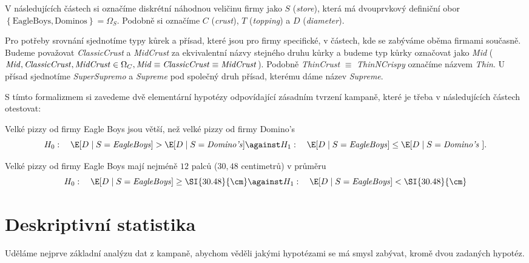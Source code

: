 V následujících částech si označíme diskrétní náhodnou veličinu firmy jako $S$ (\emph{store}), která má dvouprvkový definiční obor $\left\{ \text{EagleBoys}, \text{Dominos} \right\} = \Omega_{S} $. Podobně si označíme $C$ (\emph{crust}),  $T$ (\emph{topping}) a $D$ (\emph{diameter}).

Pro potřeby srovnání sjednotíme typy kůrek a přísad, které jsou pro firmy specifické, v částech, kde se zabýváme oběma firmami současně. Budeme považovat \emph{ClassicCrust} a \emph{MidCrust} za ekvivalentní názvy stejného druhu kůrky a budeme typ kůrky označovat jako \emph{Mid} ($\text{\emph{Mid}} ,\text{\emph{ClassicCrust}} ,\text{\emph{MidCrust}} \in \Omega_{C}, \text{\emph{Mid}} \equiv \text{\emph{ClassicCrust}} \equiv \text{\emph{MidCrust}}$). Podobně \emph{ThinCrust} $\equiv$ \emph{ThinNCrispy} označíme názvem \emph{Thin}. U přísad sjednotíme \emph{SuperSupremo} a \emph{Supreme} pod společný druh přísad, kterému dáme název \emph{Supreme}.

S tímto formalizmem si zavedeme dvě elementární hypotézy odpovídající zásadním tvrzení kampaně, které je třeba v následujících částech otestovat:
\begin{hypothesis}
	\label{hyp:nerovnost_mezi_velikostmi_pizz_firem}
	Velké pizzy od firmy Eagle Boys jsou větší, než velké pizzy od firmy Domino's
	\[
		H_0: \quad \E [D \mid S = \text{\emph{EagleBoys}}] > \E [D \mid S = \text{\emph{Domino's}}]
		\against H_1: \quad \E [ D \mid S = \text{\emph{EagleBoys}} ] \le \E [D \mid S =
			\text{\emph{Domino's} }].
	\]

\end{hypothesis}
\begin{hypothesis}
	\label{hyp:velikost_12_palcu}
	Velké pizzy od firmy Eagle Boys mají nejméně $12$ palců ($30{,}48$ centimetrů) v průměru
	\[
		H_0: \quad \E [D \mid S = \text{\emph{EagleBoys}}] \ge \SI{30.48}{\cm} \against H_1: \quad
		\E [D \mid S = \text{\emph{EagleBoys}}] < \SI{30.48}{\cm}
	\]
\end{hypothesis}


\section{Deskriptivní statistika}%
\label{sec:deskriptivní_statistika}

Uděláme nejprve základní analýzu dat z kampaně, abychom věděli jakými hypotézami se má smysl zabývat, kromě dvou zadaných hypotéz.
\pagebreak

